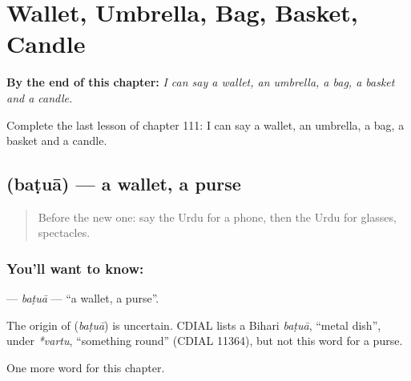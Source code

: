 
\chapter{Wallet, Umbrella, Bag, Basket, Candle}
\label{ch:ur-wallet-umbrella-bag-basket-candle}

\begin{chapteropening}
\textbf{By the end of this chapter:} \emph{I can say a wallet, an umbrella, a bag, a basket and a candle.}

Complete the last lesson of chapter 111: I can say a wallet, an umbrella, a bag, a basket and a candle.
\end{chapteropening}

\section[\texorpdfstring{\ur{بٹوا} (baṭuā)}{بٹوا (baṭuā)}]{ (baṭuā) — a wallet, a purse}

\label{lesson:UR-C111-batua}



\begin{quote}
Before the new one: say the Urdu for a phone, then the Urdu for glasses, spectacles.
\end{quote}

\subsection*{You'll want to know: }
\textbf{} — \emph{baṭuā} — \textquotedblleft{}a wallet, a purse\textquotedblright{}.

\begin{cousinweb}
The origin of \textbf{} (\emph{baṭuā}) is uncertain. CDIAL lists a Bihari \emph{baṭuā}, \textquotedblleft{}metal dish\textquotedblright{}, under \emph{*vartu}, \textquotedblleft{}something round\textquotedblright{} (CDIAL 11364), but not this word for a purse.
\end{cousinweb}

\begin{grammarlens}[title={What you've built}]
One more word for this chapter.
\end{grammarlens}

